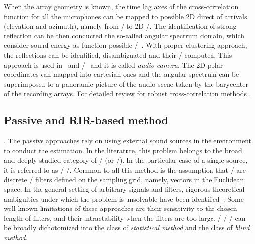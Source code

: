 When the array geometry is known, the time lag axes of the cross-correlation function for all the microphones can be mapped to possible 2D direct of arrivals (elevation and azimuth), namely from \TOAs/ to 2D-\DOAs/.
The identification of strong reflection can be then conducted the so-called angular spectrum domain, which consider sound energy as function possible \DOAs/~.
With proper clustering approach, the reflections can be identified, disambiguated and their \TOAs/ computed.
This approach is used in~ and \SSL/~ and it is called \textit{audio camera}.
The 2D-polar coordinates can mapped into cartesian ones and the angular spectrum can be superimposed to a panoramic picture of the audio scene taken by the barycenter of the recording arrays.
For detailed review for robust cross-correlation methods .

\subsection{Passive and RIR-based method}
.
The passive approaches rely on using external sound sources in the environment to conduct the estimation.
In the literature, this problem belongs to the broad and deeply studied category of \BCEdef/ (or \BSIdef/).
In the particular case of a single source, it is referred to as \SIMO/ \BCEdef/.
Common to all this method is the assumption that \RIR/ are discrete \FIR/ filters defined on the sampling grid, namely, vectors in the Euclidean space.
In the general setting of arbitrary signals and filters, rigorous theoretical ambiguities under which the problem is unsolvable have been identified~.
Some well-known limitations of these approaches are their sensitivity to the chosen length of filters, and their intractability when the filters are too large.
\FIR/ \SIMO/ \BCE/ can be broadly dichotomized into the class of \textit{statistical method} and the class of \textit{blind method}.

